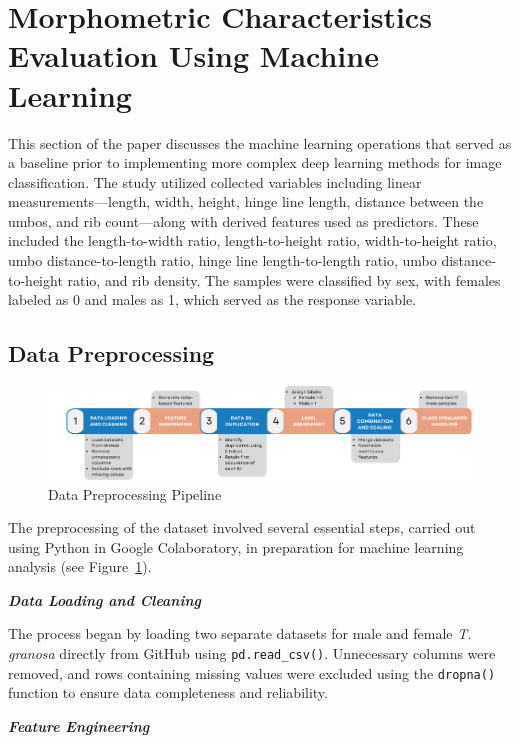 \section{Morphometric Characteristics Evaluation Using Machine Learning }
\label{sec:ml models}

This section of the paper discusses the machine learning operations that served as a baseline prior to implementing more complex deep learning methods for image classification. The study utilized collected variables including linear measurements—length, width, height, hinge line length, distance between the umbos, and rib count—along with derived features used as predictors. These included the length-to-width ratio, length-to-height ratio, width-to-height ratio, umbo distance-to-length ratio, hinge line length-to-length ratio, umbo distance-to-height ratio, and rib density. The samples were classified by sex, with females labeled as 0 and males as 1, which served as the response variable.

\subsection{Data Preprocessing}
\label{sec:pre-processing}

\begin{figure}[!htbp]
	\centering
	\includegraphics[width=1\textwidth]{figures/pipeline.png}
	\caption{Data Preprocessing Pipeline}
	\label{fig:pipeline}
\end{figure}

The preprocessing of the dataset involved several essential steps, carried out using Python in Google Colaboratory, in preparation for machine learning analysis (see Figure~\ref{fig:pipeline}).

\textbf{\textit{Data Loading and Cleaning}}

The process began by loading two separate datasets for male and female \textit{T. granosa} directly from GitHub using \texttt{pd.read\_csv()}. Unnecessary columns were removed, and rows containing missing values were excluded using the \texttt{dropna()} function to ensure data completeness and reliability.

\textbf{\textit{Feature Engineering}}

